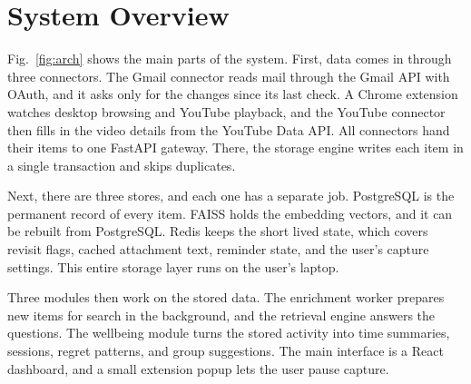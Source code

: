 \documentclass[conference]{IEEEtran}
\begin{document}
\section{System Overview}\label{sec:overview}
Fig.~\ref{fig:arch} shows the main parts of the system. First, data comes in through three connectors. The Gmail connector reads mail through the Gmail API with OAuth, and it asks only for the changes since its last check. A Chrome extension watches desktop browsing and YouTube playback, and the YouTube connector then fills in the video details from the YouTube Data API. All connectors hand their items to one FastAPI gateway. There, the storage engine writes each item in a single transaction and skips duplicates.

Next, there are three stores, and each one has a separate job. PostgreSQL is the permanent record of every item. FAISS holds the embedding vectors, and it can be rebuilt from PostgreSQL. Redis keeps the short lived state, which covers revisit flags, cached attachment text, reminder state, and the user's capture settings. This entire storage layer runs on the user's laptop.

Three modules then work on the stored data. The enrichment worker prepares new items for search in the background, and the retrieval engine answers the questions. The wellbeing module turns the stored activity into time summaries, sessions, regret patterns, and group suggestions. The main interface is a React dashboard, and a small extension popup lets the user pause capture.
\end{document}

